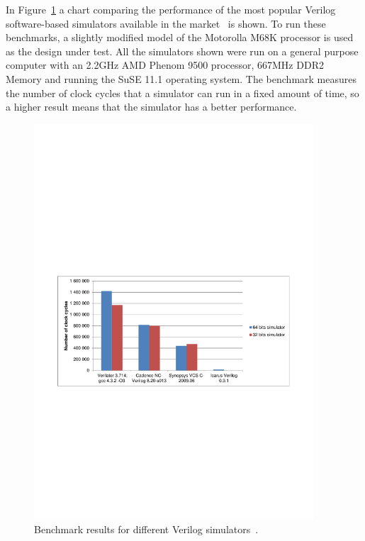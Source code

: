 In Figure~\ref{fig:performance} a chart comparing the performance of the most
popular Verilog software-based simulators available in the 
market~\cite{verilator:benchmarks} is shown. To run these benchmarks, a slightly modified 
model of the Motorolla M68K processor is used as the design under test. All the 
simulators shown were run on a general purpose computer with an 2.2GHz AMD Phenom 9500 
processor, 667MHz DDR2 Memory and running the SuSE 11.1 operating system. The benchmark
measures the number of clock cycles that a simulator can run in a fixed amount
of time, so a higher result means that the simulator has a better performance.

\begin{figure}[!htb]
	\centering
	\includegraphics[trim=0 280 0 310 , clip, 
	width=0.93\textwidth]{Figures/Performance.pdf}
	\caption{Benchmark results for different Verilog 
		simulators~\cite{verilator:benchmarks}.}
	\label{fig:performance}
\end{figure}

